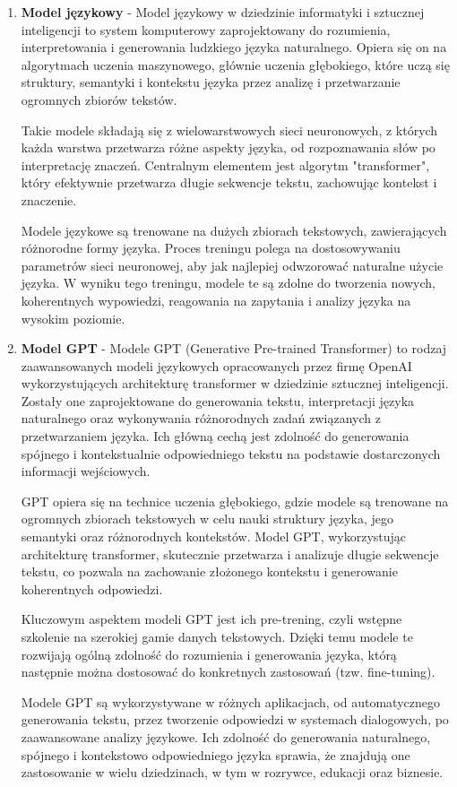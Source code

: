\begin{enumerate}
    
    \item {\bf Model językowy} - Model językowy w dziedzinie informatyki i sztucznej inteligencji to system komputerowy zaprojektowany do rozumienia, interpretowania i generowania ludzkiego języka naturalnego. Opiera się on na algorytmach uczenia maszynowego, głównie uczenia głębokiego, które uczą się struktury, semantyki i kontekstu języka przez analizę i przetwarzanie ogromnych zbiorów tekstów.

    Takie modele składają się z wielowarstwowych sieci neuronowych, z których każda warstwa przetwarza różne aspekty języka, od rozpoznawania słów po interpretację znaczeń. Centralnym elementem jest algorytm "transformer", który efektywnie przetwarza długie sekwencje tekstu, zachowując kontekst i znaczenie.
    
    Modele językowe są trenowane na dużych zbiorach tekstowych, zawierających różnorodne formy języka. Proces treningu polega na dostosowywaniu parametrów sieci neuronowej, aby jak najlepiej odwzorować naturalne użycie języka. W wyniku tego treningu, modele te są zdolne do tworzenia nowych, koherentnych wypowiedzi, reagowania na zapytania i analizy języka na wysokim poziomie.
    \\
    \item {\bf Model GPT} - Modele GPT (Generative Pre-trained Transformer) to rodzaj zaawansowanych modeli językowych opracowanych przez firmę OpenAI wykorzystujących architekturę transformer w dziedzinie sztucznej inteligencji. Zostały one zaprojektowane do generowania tekstu, interpretacji języka naturalnego oraz wykonywania różnorodnych zadań związanych z przetwarzaniem języka. Ich główną cechą jest zdolność do generowania spójnego i kontekstualnie odpowiedniego tekstu na podstawie dostarczonych informacji wejściowych.

    GPT opiera się na technice uczenia głębokiego, gdzie modele są trenowane na ogromnych zbiorach tekstowych w celu nauki struktury języka, jego semantyki oraz różnorodnych kontekstów. Model GPT, wykorzystując architekturę transformer, skutecznie przetwarza i analizuje długie sekwencje tekstu, co pozwala na zachowanie złożonego kontekstu i generowanie koherentnych odpowiedzi.
    
    Kluczowym aspektem modeli GPT jest ich pre-trening, czyli wstępne szkolenie na szerokiej gamie danych tekstowych. Dzięki temu modele te rozwijają ogólną zdolność do rozumienia i generowania języka, którą następnie można dostosować do konkretnych zastosowań (tzw. fine-tuning).
    
    Modele GPT są wykorzystywane w różnych aplikacjach, od automatycznego generowania tekstu, przez tworzenie odpowiedzi w systemach dialogowych, po zaawansowane analizy językowe. Ich zdolność do generowania naturalnego, spójnego i kontekstowo odpowiedniego języka sprawia, że znajdują one zastosowanie w wielu dziedzinach, w tym w rozrywce, edukacji oraz biznesie.
    \\
     
 \end{enumerate}


